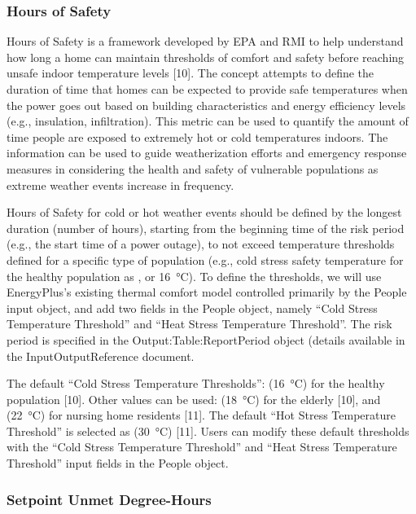 \subsubsection{Hours of Safety}\label{hours-of-safety}

Hours of Safety is a framework developed by EPA and RMI to help understand how
long a home can maintain thresholds of comfort and safety before reaching unsafe
indoor temperature levels [10]. The concept attempts to define the duration of
time that homes can be expected to provide safe temperatures when the power goes
out based on building characteristics and energy efficiency levels (e.g.,
insulation, infiltration). This metric can be used to quantify the amount of
time people are exposed to extremely hot or cold temperatures indoors. The
information can be used to guide weatherization efforts and emergency response
measures in considering the health and safety of vulnerable populations as
extreme weather events increase in frequency.

Hours of Safety for cold or hot weather events should be defined by the longest
duration (number of hours), starting from the beginning time of the risk period
(e.g., the start time of a power outage), to not exceed temperature thresholds
defined for a specific type of population (e.g., cold stress safety temperature
for the healthy population as , or \SI{16}{\celsius}). To define the
thresholds, we will use EnergyPlus's existing thermal comfort model controlled
primarily by the People input object, and add two fields in the People object,
namely ``Cold Stress Temperature Threshold'' and ``Heat Stress Temperature
Threshold''. The risk period is specified in the Output:Table:ReportPeriod object (details available in the InputOutputReference document.

The default ``Cold Stress Temperature Thresholds'':  (\SI{16}{\celsius})
for the healthy population [10]. Other values can be used: 
(\SI{18}{\celsius}) for the elderly [10], and  (\SI{22}{\celsius}) for nursing
home residents [11]. The default ``Hot Stress Temperature Threshold'' is
selected as  (\SI{30}{\celsius}) [11]. Users can modify these default
thresholds with the ``Cold Stress Temperature Threshold'' and ``Heat Stress
Temperature Threshold'' input fields in the People object.

\subsubsection{Setpoint Unmet Degree-Hours}\label{unmet-degree-hours}

